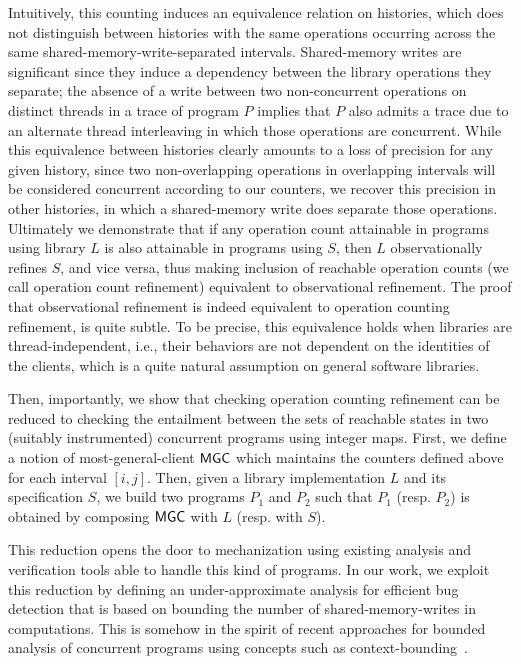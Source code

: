 Intuitively, this counting induces an equivalence relation on histories, which
does not distinguish between histories with the same operations occurring
across the same shared-memory-write-separated intervals. Shared-memory writes
are significant since they induce a dependency between the library operations
they separate; the absence of a write between two non-concurrent operations on
distinct threads in a trace of program $P$ implies that $P$ also admits a trace
due to an alternate thread interleaving in which those operations are
concurrent. While this equivalence between histories clearly amounts to a loss
of precision for any given history, since two non-overlapping operations in
overlapping intervals will be considered concurrent according to our counters,
we recover this precision in other histories, in which a shared-memory write
does separate those operations. Ultimately we demonstrate that if any operation
count attainable in programs using library $L$ is also attainable in programs
using $S$, then $L$ observationally refines $S$, and vice versa, thus making
inclusion of reachable operation counts (we call operation count refinement) equivalent to observational refinement.
The proof that observational refinement is indeed equivalent to operation counting refinement, is quite subtle. To be precise, this equivalence holds when libraries are thread-independent, i.e., their behaviors are not dependent on the identities of the clients, which is a quite natural assumption on general software libraries. 

Then, importantly, we show that checking operation counting refinement can be reduced to checking the entailment between the sets of reachable states in two (suitably instrumented) concurrent programs using integer maps. First, we define a notion of most-general-client ${\sf MGC}$ which maintains the counters defined above for each interval $[i, j]$. Then, given a library implementation $L$ and its specification $S$, we build two programs $P_1$ and $P_2$ such that $P_1$ (resp. $P_2$) is obtained by composing ${\sf MGC}$ with $L$ (resp. with $S$). 

This reduction opens the door to mechanization using existing analysis and verification tools able to handle this kind of programs.
In our work, we exploit this reduction by defining an under-approximate analysis for efficient bug detection that is based on bounding the number of shared-memory-writes in computations. This is somehow in the spirit of recent approaches for bounded analysis of concurrent programs using concepts such as context-bounding~\citep{conf/tacas/QadeerR05}. 


